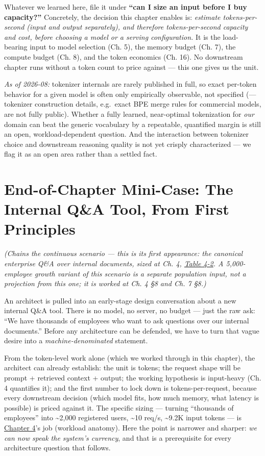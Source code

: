 Whatever we learned here, file it under \textbf{``can I size an input
before I buy capacity?''} Concretely, the decision this chapter enables
is: \emph{estimate tokens-per-second (input and output separately), and
therefore tokens-per-second capacity and cost, before choosing a model
or a serving configuration.} It is the load-bearing input to model
selection (Ch. 5), the memory budget (Ch. 7), the compute budget (Ch.
8), and the token economics (Ch. 16). No downstream chapter runs without
a token count to price against --- this one gives us the unit.

\label{what-we-still-dont-know}


\emph{As of 2026-08:} tokenizer internals are rarely published in full,
so exact per-token behavior for a given model is often only empirically
observable, not specified (--- tokenizer construction details,
e.g.~exact BPE merge rules for commercial models, are not fully public).
Whether a fully learned, near-optimal tokenization for \emph{our} domain
can beat the generic vocabulary by a repeatable, quantified margin is
still an open, workload-dependent question. And the interaction between
tokenizer choice and downstream reasoning quality is not yet crisply
characterized --- we flag it as an open area rather than a settled fact.

\section{End-of-Chapter Mini-Case: The Internal Q\&A Tool, From First
Principles}\label{end-of-chapter-mini-case-the-internal-qa-tool-from-first-principles}

\emph{(Chains the continuous scenario --- this is its first appearance:
the canonical enterprise Q\&A over internal documents, sized at Ch. 4,
\hyperref[tab:4.2]{Table 4-2}. A 5,000-employee growth variant of this scenario is a
separate population input, not a projection from this one; it is worked
at Ch. 4 §8 and Ch. 7 §8.)}

An architect is pulled into an early-stage design conversation about a
new internal Q\&A tool. There is no model, no server, no budget --- just
the raw ask: ``We have thousands of employees who want to ask questions
over our internal documents.'' Before any architecture can be defended,
we have to turn that vague desire into a \emph{machine-denominated}
statement.

From the token-level work alone (which we worked through in this
chapter), the architect can already establish: the unit is tokens; the
request shape will be prompt + retrieved context + output; the working
hypothesis is input-heavy (Ch. 4 quantifies it); and the first number to
lock down is tokens-per-request, because every downstream decision
(which model fits, how much memory, what latency is possible) is priced
against it. The specific sizing --- turning ``thousands of employees''
into \textasciitilde2,000 registered users, \textasciitilde10 req/s,
\textasciitilde9.2K input tokens --- is \hyperref[chap:4]{Chapter 4}'s job (workload
anatomy). Here the point is narrower and sharper: \emph{we can now speak
the system's currency}, and that is a prerequisite for every
architecture question that follows.
